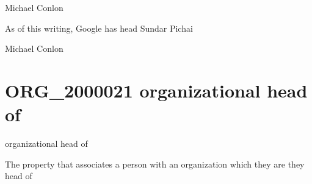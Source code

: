 \documentclass[letterpaper,10pt,english]{sphinxmanual}
\begin{document}
\begin{sphinxShadowBox}

\sphinxAtStartPar
Michael Conlon 
\end{sphinxShadowBox}

\begin{sphinxShadowBox}

\sphinxAtStartPar
As of this writing, Google has head Sundar Pichai
\end{sphinxShadowBox}

\begin{sphinxShadowBox}

\sphinxAtStartPar
{}
\end{sphinxShadowBox}

\begin{sphinxShadowBox}

\sphinxAtStartPar
Michael Conlon 
\end{sphinxShadowBox}
\begin{quote}
\label{\detokenize{doc-ORG_2000021:org-2000021}}\label{\detokenize{doc-ORG_2000021:organizational-head-of}}\label{\detokenize{doc-ORG_2000021:org-2000021}}
\ignorespaces \end{quote}


\section{ORG\_2000021 \sphinxhyphen{} organizational head of}
\label{\detokenize{doc-ORG_2000021:org-2000021-organizational-head-of}}\label{\detokenize{doc-ORG_2000021:index-0}}\label{\detokenize{doc-ORG_2000021::doc}}
\begin{sphinxShadowBox}

\sphinxAtStartPar
organizational head of
\end{sphinxShadowBox}

\begin{sphinxShadowBox}

\sphinxAtStartPar
The property that associates a person with an organization which they are they head of
\end{sphinxShadowBox}
\end{document}
